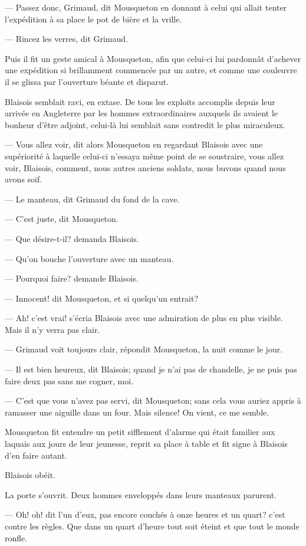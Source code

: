 — Passez donc, Grimaud, dit Mousqueton en donnant à celui qui allait tenter l'expédition à sa place le pot de bière et la vrille.

— Rincez les verres, dit Grimaud.

Puis il fit un geste amical à Mousqueton, afin que celui-ci lui pardonnât d'achever une expédition si brillamment commencée par un autre, et comme une couleuvre il se glissa par l'ouverture béante et disparut.

Blaisois semblait ravi, en extase. De tous les exploits accomplis depuis leur arrivée en Angleterre par les hommes extraordinaires auxquels ils avaient le bonheur d'être adjoint, celui-là lui semblait sans contredit le plus miraculeux.

— Vous allez voir, dit alors Mousqueton en regardant Blaisois avec une supériorité à laquelle celui-ci n'essaya même point de se soustraire, vous allez voir, Blaisois, comment, nous autres anciens soldats, nous buvons quand nous avons soif.

— Le manteau, dit Grimaud du fond de la cave.

— C'est juste, dit Mousqueton.

— Que désire-t-il? demanda Blaisois.

— Qu'on bouche l'ouverture avec un manteau.

— Pourquoi faire? demande Blaisois.

— Innocent! dit Mousqueton, et si quelqu'un entrait?

— Ah! c'est vrai! s'écria Blaisois avec une admiration de plus en plus visible. Mais il n'y verra pas clair.

— Grimaud voit toujours clair, répondit Mousqueton, la nuit comme le jour.

— Il est bien heureux, dit Blaisois; quand je n'ai pas de chandelle, je ne puis pas faire deux pas sans me cogner, moi.

— C'est que vous n'avez pas servi, dit Mousqueton; sans cela vous auriez appris à ramasser une aiguille dans un four. Mais silence! On vient, ce me semble.

Mousqueton fit entendre un petit sifflement d'alarme qui était familier aux laquais aux jours de leur jeunesse, reprit sa place à table et fit signe à Blaisois d'en faire autant.

Blaisois obéit.

La porte s'ouvrit. Deux hommes enveloppés dans leurs manteaux parurent.

— Oh! oh! dit l'un d'eux, pas encore couchés à onze heures et un quart? c'est contre les règles. Que dans un quart d'heure tout soit éteint et que tout le monde ronfle.

